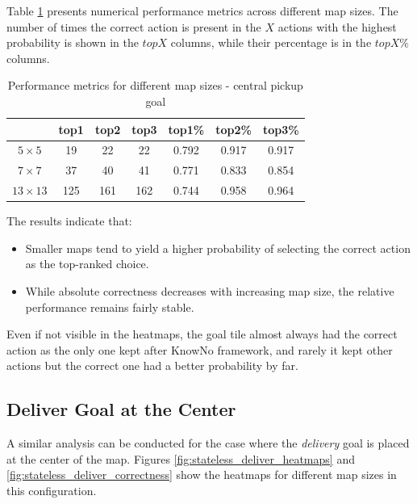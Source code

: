 Table \ref{tab:performance} presents numerical performance metrics across
different map sizes. The number of times the correct action is present in the $X$
actions with the highest probability is shown in the $topX$ columns, while their
percentage is in the $topX\%$ columns.

\vspace{5mm}
\begin{table}[ht]
  \centering
  \begin{tabular}{c|ccc|ccc}
                   & top1 & top2 & top3 & top1\% & top2\% & top3\% \\
    \hline
    $5 \times 5$   & 19   & 22   & 22   & 0.792  & 0.917  & 0.917  \\
    $7 \times 7$   & 37   & 40   & 41   & 0.771  & 0.833  & 0.854  \\
    $13 \times 13$ & 125  & 161  & 162  & 0.744  & 0.958  & 0.964  \\
  \end{tabular}
  \caption{Performance metrics for different map sizes - central pickup goal}
  \label{tab:performance}
\end{table}
\vspace{5mm}

The results indicate that:
\begin{itemize}
  \item Smaller maps tend to yield a higher probability of selecting the correct
    action as the top-ranked choice.

  \item While absolute correctness decreases with increasing map size, the
    relative performance remains fairly stable.
\end{itemize}

Even if not visible in the heatmaps, the goal tile almost always had the correct
action as the only one kept after KnowNo framework, and rarely it kept other actions
but the correct one had a better probability by far.

\subsection{Deliver Goal at the Center}

A similar analysis can be conducted for the case where the \emph{delivery} goal is
placed at the center of the map. Figures \ref{fig:stateless_deliver_heatmaps}
and \ref{fig:stateless_deliver_correctness} show the heatmaps for different map
sizes in this configuration.

